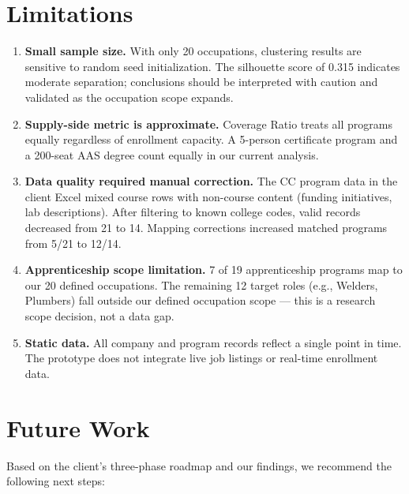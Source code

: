 \documentclass[12pt]{article}
\begin{document}
\section{Limitations}

\begin{enumerate}
    \item \textbf{Small sample size.} With only 20 occupations,
    clustering results are sensitive to random seed
    initialization. The silhouette score of 0.315 indicates
    moderate separation; conclusions should be interpreted
    with caution and validated as the occupation scope expands.

    \item \textbf{Supply-side metric is approximate.} Coverage
    Ratio treats all programs equally regardless of enrollment
    capacity. A 5-person certificate program and a 200-seat AAS
    degree count equally in our current analysis.

    \item \textbf{Data quality required manual correction.} The
    CC program data in the client Excel mixed course rows with
    non-course content (funding initiatives, lab descriptions).
    After filtering to known college codes, valid records
    decreased from 21 to 14. Mapping corrections increased
    matched programs from 5/21 to 12/14.

    \item \textbf{Apprenticeship scope limitation.} 7 of 19
    apprenticeship programs map to our 20 defined occupations.
    The remaining 12 target roles (e.g., Welders, Plumbers) fall
    outside our defined occupation scope --- this is a research
    scope decision, not a data gap.

    \item \textbf{Static data.} All company and program records
    reflect a single point in time. The prototype does not
    integrate live job listings or real-time enrollment data.
\end{enumerate}

\section{Future Work}

Based on the client's three-phase roadmap and our findings, we
recommend the following next steps:
\end{document}
